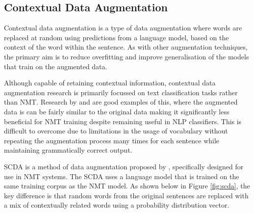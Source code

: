 


\subsection{Contextual Data Augmentation}

Contextual data augmentation is a type of data augmentation where words are replaced at random using predictions from a language model, based on the context of the word within the sentence. As with other augmentation techniques, the primary aim is to reduce overfitting and improve generalisation of the models that train on the augmented data. 

Although capable of retaining contextual information, contextual data augmentation research is primarily focussed on text classification tasks rather than \acrshort{NMT}. Research by \cite{wu_conditional_2018} and \cite{kobayashi_contextual_2018} are good examples of this, where the augmented data is can be fairly similar to the original data making it significantly less beneficial for \acrshort{NMT} training despite remaining useful in \acrshort{NLP} classifiers. This is difficult to overcome due to limitations in the usage of vocabulary without repeating the augmentation process many times for each sentence while maintaining grammatically correct output.

\acrfull{SCDA} is a method of data augmentation proposed by \cite{zhu_soft_2019}, specifically designed for use in \acrshort{NMT} systems. The \acrshort{SCDA} uses a language model that is trained on the same training corpus as the \acrshort{NMT} model. As shown below in Figure \ref{fig:scda}, the key difference is that random words from the original sentences are replaced with a mix of contextually related words using a probability distribution vector.


